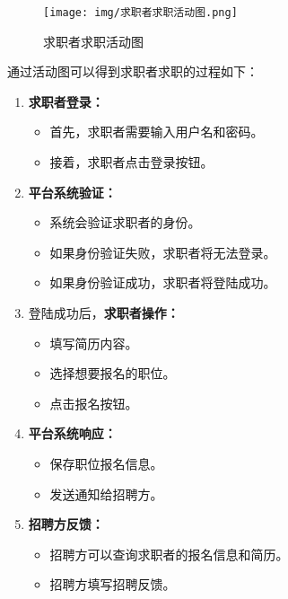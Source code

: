 \documentclass[UTF8,a4paper,10pt]{ctexart}
\begin{document}
\begin{figure}[H]
    \centering
    \texttt{[image: img/求职者求职活动图.png]}
    \caption{求职者求职活动图}
    \label{fig:求职者求职活动图}
\end{figure}

通过活动图可以得到求职者求职的过程如下：

\begin{enumerate}
    \item \textbf{求职者登录：}
        \begin{itemize}
            \item 首先，求职者需要输入用户名和密码。
            \item 接着，求职者点击登录按钮。
        \end{itemize}
    
    \item \textbf{平台系统验证：}
        \begin{itemize}
            \item 系统会验证求职者的身份。
            \item 如果身份验证失败，求职者将无法登录。
            \item 如果身份验证成功，求职者将登陆成功。
        \end{itemize}
    
    \item 登陆成功后，\textbf{求职者操作：}
        \begin{itemize}
            \item 填写简历内容。
            \item 选择想要报名的职位。
            \item 点击报名按钮。
        \end{itemize}
    
    \item \textbf{平台系统响应：}
        \begin{itemize}
            \item 保存职位报名信息。
            \item 发送通知给招聘方。
        \end{itemize}
    
    \item \textbf{招聘方反馈：}
        \begin{itemize}
            \item 招聘方可以查询求职者的报名信息和简历。
            \item 招聘方填写招聘反馈。
        \end{itemize}
\end{enumerate}
\end{document}

